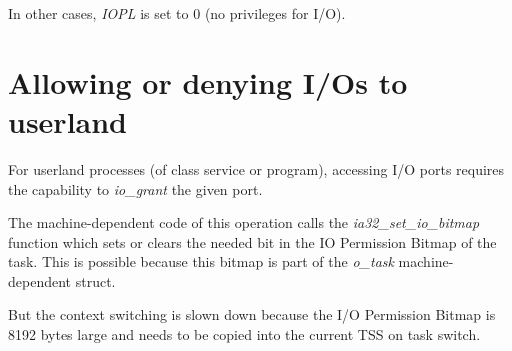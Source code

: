 In other cases, \textit{IOPL} is set to 0 (no privileges for I/O).

%
%

\section{Allowing or denying I/Os to userland}

For userland processes (of class service or program), accessing I/O
ports requires the capability to \textit{io\_grant} the given port.

The machine-dependent code of this operation calls the
\textit{ia32\_set\_io\_bitmap} function which sets or clears the
needed bit in the IO Permission Bitmap of the task. This is possible
because this bitmap is part of the \textit{o\_task} machine-dependent
struct.

But the context switching is slown down because the I/O Permission
Bitmap is 8192 bytes large and needs to be copied into the current TSS
on task switch.

